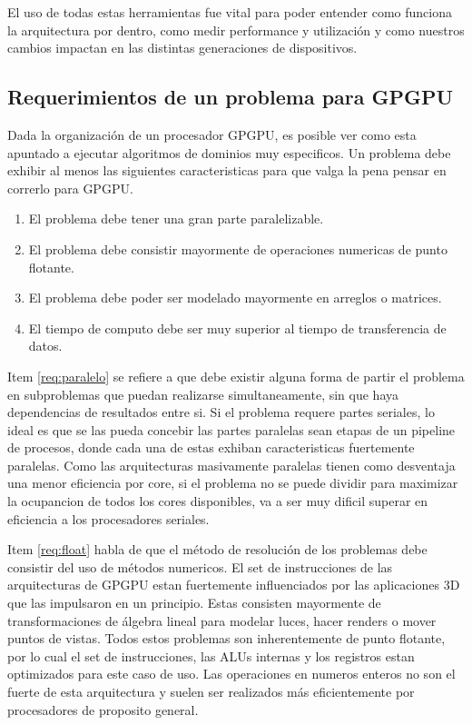 El uso de todas estas herramientas fue vital para poder entender como funciona la arquitectura por dentro,
como medir performance y utilizaci\'on y como nuestros cambios impactan en las distintas generaciones
de dispositivos.

\subsection{Requerimientos de un problema para GPGPU}
Dada la organizaci\'on de un procesador GPGPU, es posible ver como esta apuntado a ejecutar
algoritmos de dominios muy especificos. Un problema debe exhibir al menos las siguientes
caracteristicas para que valga la pena pensar en correrlo para GPGPU.
\begin{enumerate}
  \item \label{req:paralelo} El problema debe tener una gran parte paralelizable.
  \item \label{req:float} El problema debe consistir mayormente de operaciones numericas de punto flotante.
  \item \label{req:matrix} El problema debe poder ser modelado mayormente en arreglos o matrices.
  \item \label{req:transf} El tiempo de computo debe ser muy superior al tiempo de transferencia de datos.
\end{enumerate}

Item \ref{req:paralelo} se refiere a que debe existir alguna forma de partir el problema
en subproblemas que puedan realizarse simultaneamente, sin que haya dependencias de
resultados entre si. Si el problema requere partes seriales, lo ideal es que se las
pueda concebir las partes paralelas sean etapas de un pipeline de procesos, donde
cada una de estas exhiban caracteristicas fuertemente paralelas. Como las arquitecturas
masivamente paralelas tienen como desventaja una menor eficiencia por core, si el
problema no se puede dividir para maximizar la ocupancion de todos los cores disponibles,
va a ser muy dificil superar en eficiencia a los procesadores seriales.

Item \ref{req:float} habla de que el m\'etodo de resoluci\'on de los problemas debe
consistir del uso de m\'etodos numericos. El set de instrucciones de las arquitecturas
de GPGPU estan fuertemente influenciados por las aplicaciones 3D que las impulsaron
en un principio. Estas consisten mayormente de transformaciones de \'algebra lineal
para modelar luces, hacer renders o mover puntos de vistas. Todos estos problemas
son inherentemente de punto flotante, por lo cual el set de instrucciones, las ALUs
internas y los registros estan optimizados para este caso de uso. Las operaciones
en numeros enteros no son el fuerte de esta arquitectura y suelen ser realizados
m\'as eficientemente por procesadores de proposito general.

